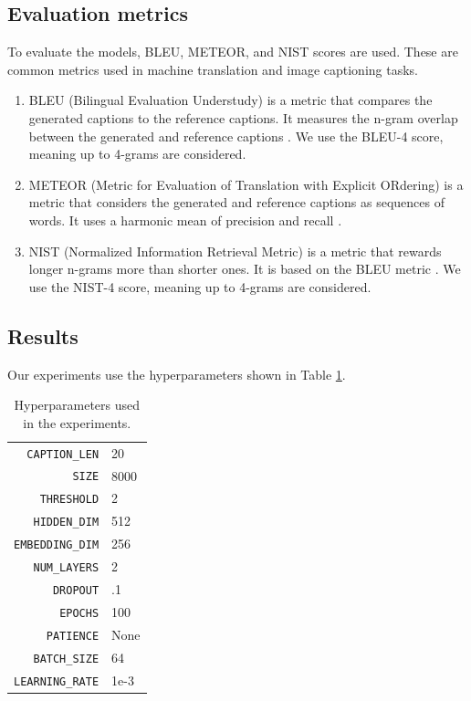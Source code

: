\documentclass[12pt]{article}
\theoremstyle{plain}
\theoremstyle{definition}
\theoremstyle{remark}
\begin{document}
\subsection{Evaluation metrics}\label{sec:evaluation-metrics}
To evaluate the models, BLEU, METEOR, and NIST scores are used. These are common metrics used in machine translation and image captioning tasks.
\begin{enumerate}
    \item BLEU (Bilingual Evaluation Understudy) is a metric that compares the generated captions to the reference captions. It measures the n-gram overlap between the generated and reference captions \cite{papineni2002bleu}. We use the BLEU-4 score, meaning up to 4-grams are considered.
    \item METEOR (Metric for Evaluation of Translation with Explicit ORdering) is a metric that considers the generated and reference captions as sequences of words. It uses a harmonic mean of precision and recall \cite{banerjee2005meteor}.
    \item NIST (Normalized Information Retrieval Metric) is a metric that rewards longer n-grams more than shorter ones. It is based on the BLEU metric \cite{doddington2002nist}. We use the NIST-4 score, meaning up to 4-grams are considered.
\end{enumerate}

\subsection{Results}\label{sec:results}
Our experiments use the hyperparameters shown in Table \ref{tab:hyperparameters}.
\begin{table}[H]
    \center
    \fontsize{8}{10}\selectfont
    \begin{tabular}{r|l}
        \texttt{CAPTION\_LEN}   & 20   \\
        \texttt{SIZE}           & 8000 \\
        \texttt{THRESHOLD}      & 2    \\
        \texttt{HIDDEN\_DIM}    & 512  \\
        \texttt{EMBEDDING\_DIM} & 256  \\
        \texttt{NUM\_LAYERS}    & 2    \\
        \texttt{DROPOUT}        & .1   \\
        \texttt{EPOCHS}         & 100  \\
        \texttt{PATIENCE}       & None \\
        \texttt{BATCH\_SIZE}    & 64   \\
        \texttt{LEARNING\_RATE} & 1e-3
    \end{tabular}
    \caption{Hyperparameters used in the experiments.}\label{tab:hyperparameters}
\end{table}
\end{document}
